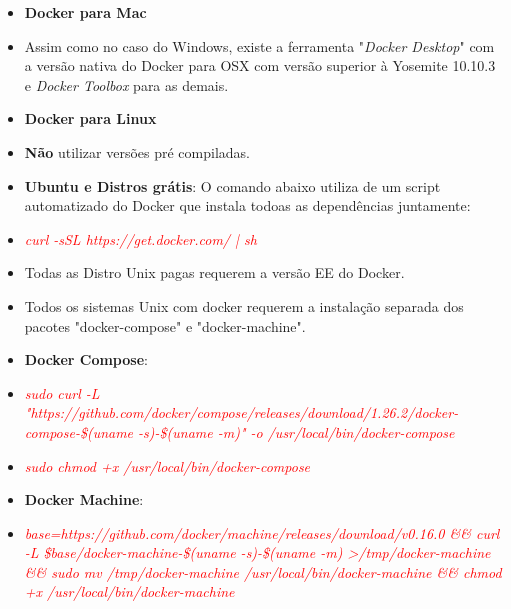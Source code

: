 \documentclass[10pt]{beamer}
\theoremstyle{remark}
\theoremstyle{definition}
\newcommand{\code}[1]{\textcolor{red} {\textit{#1}}} %
\begin{document}
\begin{frame}[allowframebreaks]
	\begin{itemize}
		\item \textbf{Docker para Mac}
		
		\item Assim como no caso do Windows, existe a ferramenta "\textit{Docker Desktop}" com a versão nativa do Docker para OSX com versão superior à Yosemite 10.10.3 e \textit{Docker Toolbox} para as demais.
	\end{itemize}
	
	\framebreak
	
	\begin{itemize}
		\item \textbf{Docker para Linux}
		
		\item \textbf{Não} utilizar versões pré compiladas.
		
		\item  \textbf{Ubuntu e Distros grátis}: O comando abaixo utiliza de um script automatizado do Docker que instala todoas as dependências juntamente:
		
		\item \code{curl -sSL https://get.docker.com/ | sh}
		
		\item Todas as Distro Unix pagas requerem a versão EE do Docker.
		
		\item Todos os sistemas Unix com docker requerem a instalação separada dos pacotes "docker-compose" e  "docker-machine".
	\end{itemize}
	
	\framebreak
	
	\begin{itemize}
		\item \textbf{Docker Compose}:
		\item \code{sudo curl -L "https://github.com/docker/compose/releases/download/1.26.2/docker-compose-\$(uname -s)-\$(uname -m)" -o /usr/local/bin/docker-compose}
		\item \code{sudo chmod +x /usr/local/bin/docker-compose}
	\end{itemize}
	
	\framebreak
	
	\begin{itemize}
		\item \textbf{Docker Machine}:
		\item \code{base=https://github.com/docker/machine/releases/download/v0.16.0 \&\&  curl -L \$base/docker-machine-\$(uname -s)-\$(uname -m) >/tmp/docker-machine \&\&  sudo mv /tmp/docker-machine /usr/local/bin/docker-machine \&\&
  chmod +x /usr/local/bin/docker-machine}
	\end{itemize}
	

\end{frame}
\end{document}
